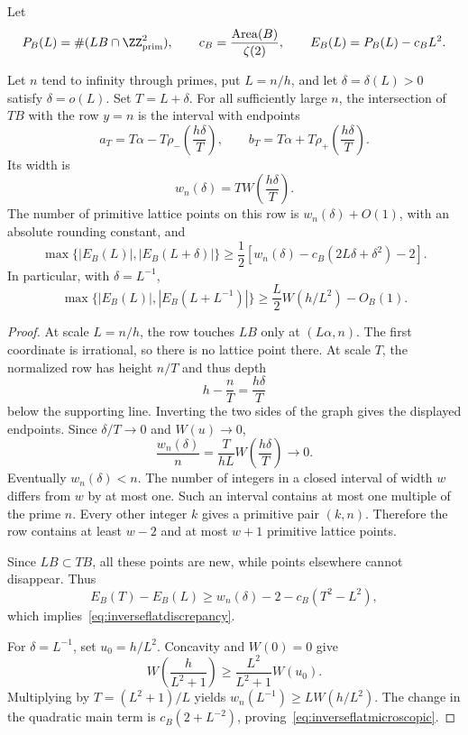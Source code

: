Let
\[
 P_B(L)=\#(LB\cap\ZZ^2_{\rm prim}),\qquad
 c_B=\frac{\operatorname{Area}(B)}{\zeta(2)},\qquad
 E_B(L)=P_B(L)-c_BL^2.
\]

\begin{proposition}
\label{prop:inverseflatrow}
Let $n$ tend to infinity through primes, put $L=n/h$, and let
$\delta=\delta(L)>0$ satisfy $\delta=o(L)$. Set $T=L+\delta$.
For all sufficiently large $n$, the intersection of $TB$ with the row
$y=n$ is the interval with endpoints
\[
 a_T=T\alpha-T\rho_-\!\left(\frac{h\delta}{T}\right),\qquad
 b_T=T\alpha+T\rho_+\!\left(\frac{h\delta}{T}\right).
\]
Its width is
\begin{equation}
 w_n(\delta)=T W\!\left(\frac{h\delta}{T}\right).
 \label{eq:inverseflatwidth}
\end{equation}
The number of primitive lattice points on this row is $w_n(\delta)+O(1)$,
with an absolute rounding constant, and
\begin{equation}
 \max\{|E_B(L)|,|E_B(L+\delta)|\}
 \geq\frac12\left[
 w_n(\delta)-c_B(2L\delta+\delta^2)-2\right].
 \label{eq:inverseflatdiscrepancy}
\end{equation}
In particular, with $\delta=L^{-1}$,
\begin{equation}
 \max\{|E_B(L)|,|E_B(L+L^{-1})|\}
 \geq\frac L2W(h/L^2)-O_B(1).
 \label{eq:inverseflatmicroscopic}
\end{equation}
\end{proposition}

\begin{proof}
At scale $L=n/h$, the row touches $LB$ only at $(L\alpha,n)$.
The first coordinate is irrational, so there is no lattice point there.
At scale $T$, the normalized row has height $n/T$ and thus depth
\[
 h-\frac nT=\frac{h\delta}{T}
\]
below the supporting line. Inverting the two sides of the graph gives
the displayed endpoints. Since $\delta/T\to0$ and $W(u)\to0$,
\[
 \frac{w_n(\delta)}n=\frac{T}{hL}
 W\!\left(\frac{h\delta}{T}\right)\longrightarrow0.
\]
Eventually $w_n(\delta)<n$. The number of integers in a closed interval
of width $w$ differs from $w$ by at most one. Such an interval contains
at most one multiple of the prime $n$. Every other integer $k$ gives a
primitive pair $(k,n)$. Therefore the row contains at least $w-2$ and
at most $w+1$ primitive lattice points.

Since $LB\subset TB$, all these points are new, while points elsewhere
cannot disappear. Thus
\[
 E_B(T)-E_B(L)
 \geq w_n(\delta)-2-c_B(T^2-L^2),
\]
which implies~\eqref{eq:inverseflatdiscrepancy}.

For $\delta=L^{-1}$, set $u_0=h/L^2$. Concavity and $W(0)=0$ give
\[
 W\!\left(\frac h{L^2+1}\right)
 \geq\frac{L^2}{L^2+1}W(u_0).
\]
Multiplying by $T=(L^2+1)/L$ yields
$w_n(L^{-1})\geq LW(h/L^2)$. The change in the quadratic main term
is $c_B(2+L^{-2})$, proving~\eqref{eq:inverseflatmicroscopic}.
\end{proof}

